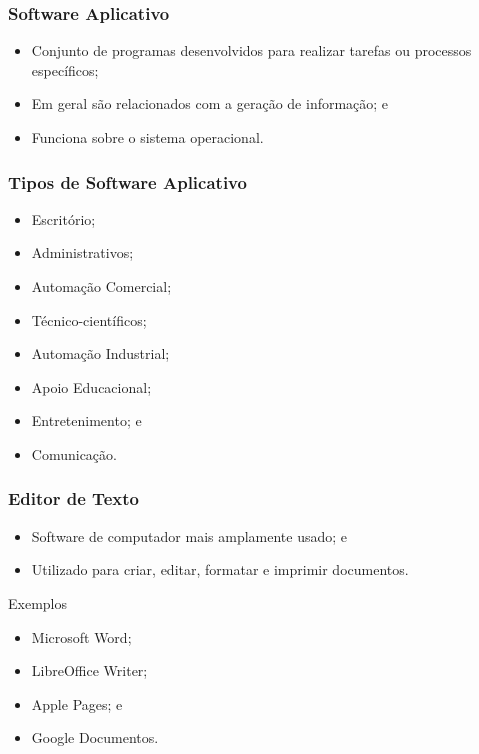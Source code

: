 \documentclass[aspectratio=169]{beamer} %
\begin{document}
\begin{frame}
	\frametitle{Software Aplicativo}
		
	\begin{itemize}
		\item Conjunto de programas desenvolvidos para realizar tarefas ou processos específicos;
		\item Em geral são relacionados com a geração de informação; e
		\item Funciona sobre o sistema operacional.
	\end{itemize}
\end{frame}

\begin{frame}
	\frametitle{Tipos de Software Aplicativo}
		
	\begin{itemize}
		\item Escritório; 
		\item Administrativos; 
		\item Automação Comercial;
		\item Técnico-científicos; 
		\item Automação Industrial; 
		\item Apoio Educacional; 
		\item Entretenimento; e
		\item Comunica\c cão.
	\end{itemize}
\end{frame}

\begin{frame}
	\frametitle{Editor de Texto}
		
	\begin{itemize}
		\item Software de computador mais amplamente usado; e
		\item Utilizado para criar, editar, formatar e imprimir documentos. 
	\end{itemize} \vfill
	
	\begin{exampleblock}{Exemplos}
		\begin{itemize}
			\item Microsoft Word;
			\item LibreOffice Writer;
			\item Apple Pages; e
			\item Google Documentos.	
		\end{itemize}
	\end{exampleblock}
\end{frame}
\end{document}
